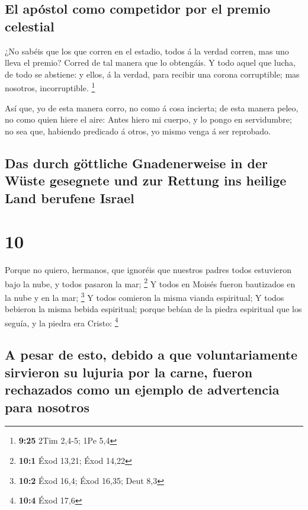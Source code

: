 \hypertarget{el-apuxf3stol-como-competidor-por-el-premio-celestial}{%
\subsection{El apóstol como competidor por el premio
celestial}\label{el-apuxf3stol-como-competidor-por-el-premio-celestial}}

 ¿No sabéis que los que corren en el estadio, todos á la
verdad corren, mas uno lleva el premio? Corred de tal manera que lo
obtengáis.  Y todo aquel que lucha, de todo se abstiene: y
ellos, á la verdad, para recibir una corona corruptible; mas nosotros,
incorruptible. \footnote{\textbf{9:25} 2Tim 2,4-5; 1Pe 5,4}

 Así que, yo de esta manera corro, no como á cosa incierta;
de esta manera peleo, no como quien hiere el aire:  Antes
hiero mi cuerpo, y lo pongo en servidumbre; no sea que, habiendo
predicado á otros, yo mismo venga á ser reprobado.

\hypertarget{das-durch-guxf6ttliche-gnadenerweise-in-der-wuxfcste-gesegnete-und-zur-rettung-ins-heilige-land-berufene-israel}{%
\subsection{Das durch göttliche Gnadenerweise in der Wüste gesegnete und
zur Rettung ins heilige Land berufene
Israel}\label{das-durch-guxf6ttliche-gnadenerweise-in-der-wuxfcste-gesegnete-und-zur-rettung-ins-heilige-land-berufene-israel}}

\hypertarget{section-9}{%
\section{10}\label{section-9}}

 Porque no quiero, hermanos, que ignoréis que nuestros
padres todos estuvieron bajo la nube, y todos pasaron la mar;
\footnote{\textbf{10:1} Éxod 13,21; Éxod 14,22}  Y todos en
Moisés fueron bautizados en la nube y en la mar; \footnote{\textbf{10:2}
  Éxod 16,4; Éxod 16,35; Deut 8,3}  Y todos comieron la
misma vianda espiritual;  Y todos bebieron la misma bebida
espiritual; porque bebían de la piedra espiritual que los seguía, y la
piedra era Cristo: \footnote{\textbf{10:4} Éxod 17,6}

\hypertarget{a-pesar-de-esto-debido-a-que-voluntariamente-sirvieron-su-lujuria-por-la-carne-fueron-rechazados-como-un-ejemplo-de-advertencia-para-nosotros}{%
\subsection{A pesar de esto, debido a que voluntariamente sirvieron su
lujuria por la carne, fueron rechazados como un ejemplo de advertencia
para
nosotros}\label{a-pesar-de-esto-debido-a-que-voluntariamente-sirvieron-su-lujuria-por-la-carne-fueron-rechazados-como-un-ejemplo-de-advertencia-para-nosotros}}

